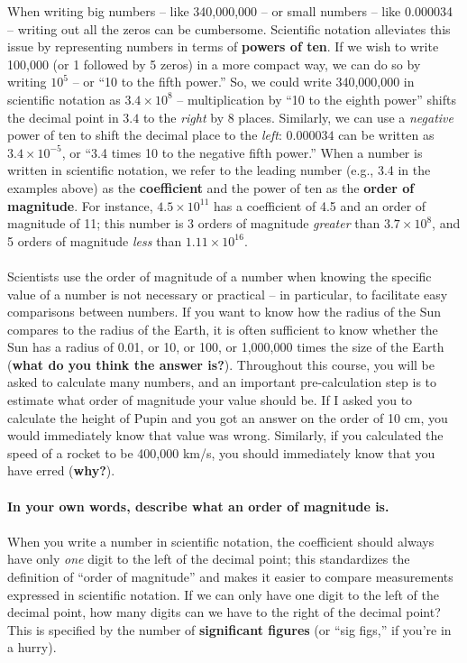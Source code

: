 \documentclass[11pt]{article}
\begin{document}
When writing big numbers -- like 340,000,000 -- or small numbers -- like 0.000034 -- writing out all the zeros can be cumbersome. Scientific notation alleviates this issue by representing numbers in terms of \textbf{powers of ten}. If we wish to write 100,000 (or 1 followed by 5 zeros) in a more compact way, we can do so by writing $10^5$ -- or ``10 to the fifth power.'' So, we could write 340,000,000 in scientific notation as $3.4 \times 10^8$ -- multiplication by ``10 to the eighth power'' shifts the decimal point in $3.4$ to the \emph{right} by 8 places. Similarly, we can use a \emph{negative} power of ten to shift the decimal place to the \emph{left}: $0.000034$ can be written as $3.4 \times 10^{-5}$, or ``3.4 times 10 to the negative fifth power.'' When a number is written in scientific notation, we refer to the leading number (e.g., 3.4 in the examples above) as the \textbf{coefficient} and the power of ten as the \textbf{order of magnitude}. For instance, $4.5 \times 10^{11}$ has a coefficient of 4.5 and an order of magnitude of 11; this number is 3 orders of magnitude \emph{greater} than $3.7 \times 10^8$, and 5 orders of magnitude \emph{less} than $1.11 \times 10^{16}$.
\\ \\
\noindent
Scientists use the order of magnitude of a number when knowing the specific value of a number is not necessary or practical -- in particular, to facilitate easy comparisons between numbers.  If you want to know how the radius of the Sun compares to the radius of the Earth, it is often sufficient to know whether the Sun has a radius of 0.01, or 10, or 100, or 1,000,000 times the size of the Earth (\textbf{what do you think the answer is?}).  Throughout this course, you will be asked to calculate many numbers, and an important pre-calculation step is to estimate what order of magnitude your value should be.  If I asked you to calculate the height of Pupin and you got an answer on the order of 10 cm, you would immediately know that value was wrong.  Similarly, if you calculated the speed of a rocket to be 400,000 km/s, you should immediately know that you have erred (\textbf{why?}).
\\ \\ \noindent
\textbf{In your own words, describe what an order of magnitude is.} 
\\ \\ \noindent
When you write a number in scientific notation, the coefficient should always have only \emph{one} digit to the left of the decimal point; this standardizes the definition of ``order of magnitude'' and makes it easier to compare measurements expressed in scientific notation. If we can only have one digit to the left of the decimal point, how many digits can we have to the right of the decimal point? This is specified by the number of \textbf{significant figures} (or ``sig figs,'' if you're in a hurry).
\end{document}
